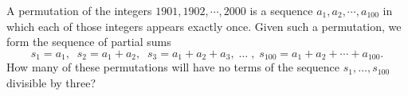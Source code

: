 A permutation of the integers $1901, 1902, \cdots, 2000$ is a sequence  $a_1, a_2, \cdots, a_{100}$ in which each of those integers appears exactly once. Given such a permutation, we form the sequence of partial sums\[s_1 = a_1,\;\;s_2 = a_1 + a_2,\;\;s_3 = a_1 + a_2 + a_3, \; \ldots\;, \; s_{100} = a_1 + a_2 + \cdots + a_{100}.\]How many of these permutations will have no terms of the sequence $s_1, \ldots, s_{100}$ divisible by three?